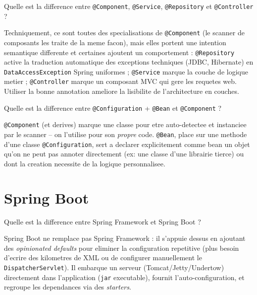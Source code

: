 \documentclass[11pt,a4paper]{article}
\begin{document}
\begin{question} Quelle est la difference entre \texttt{@Component}, \texttt{@Service}, \texttt{@Repository} et \texttt{@Controller} ?
\end{question}
\begin{reponse}
Techniquement, ce sont toutes des specialisations de \texttt{@Component} (le scanner de composants les traite de la meme facon), mais elles portent une intention semantique differente et certaines ajoutent un comportement : \texttt{@Repository} active la traduction automatique des exceptions techniques (JDBC, Hibernate) en \texttt{DataAccessException} Spring uniformes ; \texttt{@Service} marque la couche de logique metier ; \texttt{@Controller} marque un composant MVC qui gere les requetes web. Utiliser la bonne annotation ameliore la lisibilite de l'architecture en couches.
\end{reponse}

\begin{question} Quelle est la difference entre \texttt{@Configuration} + \texttt{@Bean} et \texttt{@Component} ?
\end{question}
\begin{reponse}
\texttt{@Component} (et derives) marque une classe pour etre auto-detectee et instanciee par le scanner -- on l'utilise pour son \emph{propre} code. \texttt{@Bean}, place sur une methode d'une classe \texttt{@Configuration}, sert a declarer explicitement comme bean un objet qu'on ne peut pas annoter directement (ex: une classe d'une librairie tierce) ou dont la creation necessite de la logique personnalisee.
\end{reponse}

\newpage
\section{Spring Boot}

\begin{question} Quelle est la difference entre Spring Framework et Spring Boot ?
\end{question}
\begin{reponse}
Spring Boot ne remplace pas Spring Framework : il s'appuie dessus en ajoutant des \emph{opinionated defaults} pour eliminer la configuration repetitive (plus besoin d'ecrire des kilometres de XML ou de configurer manuellement le \texttt{DispatcherServlet}). Il embarque un serveur (Tomcat/Jetty/Undertow) directement dans l'application (\texttt{jar} executable), fournit l'auto-configuration, et regroupe les dependances via des \emph{starters}.
\end{reponse}
\end{document}
